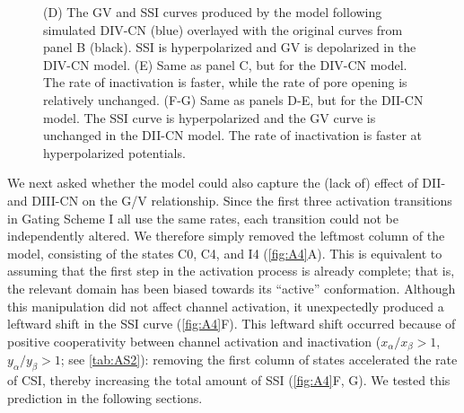 \begin{figure}[t]
\begin{minipage}[c]{80mm}
{    (D) The GV and SSI curves produced by the model following simulated DIV-CN (blue) overlayed with the original curves from panel B (black). SSI is hyperpolarized and GV is depolarized in the DIV-CN model.
    (E) Same as panel C, but for the DIV-CN model. The rate of inactivation is faster, while the rate of pore opening is relatively unchanged. 
    (F-G) Same as panels D-E, but for the DII-CN model. The SSI curve is hyperpolarized and the GV curve is unchanged in the DII-CN model. The rate of inactivation is faster at hyperpolarized potentials.}
    \label{fig:A4}
\end{minipage}
\end{figure}

We next asked whether the model could also capture the (lack of) effect of DII- and DIII-CN on the G/V relationship. Since the first three activation transitions in Gating Scheme I all use the same rates, each transition could not be independently altered. We therefore simply removed the leftmost column of the model, consisting of the states C0, C4, and I4 (\autoref{fig:A4}A). This is equivalent to assuming that the first step in the activation process is already complete; that is, the relevant domain has been biased towards its “active” conformation. Although this manipulation did not affect channel activation, it unexpectedly produced a leftward shift in the SSI curve (\autoref{fig:A4}F). This leftward shift occurred because of positive cooperativity between channel activation and inactivation ($x_\alpha/x_\beta>1$, $y_\alpha/y_\beta>1$; see \autoref{tab:AS2}): removing the first column of states accelerated the rate of CSI, thereby increasing the total amount of SSI (\autoref{fig:A4}F, G). We tested this prediction in the following sections.
	
